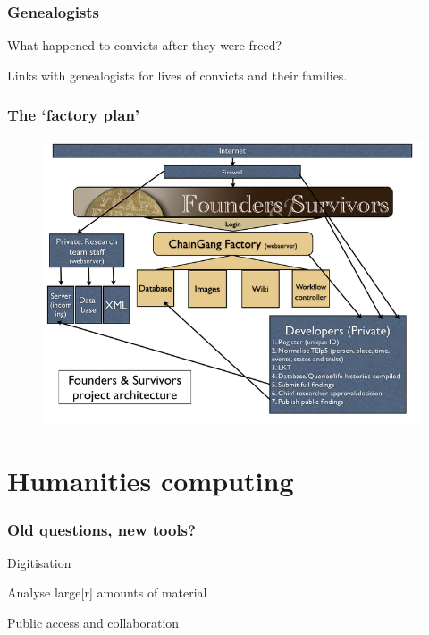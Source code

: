 \documentclass[ignorenonframetext,11pt]{beamer}
\begin{document}
\begin{frame}
\frametitle{Genealogists}
\label{genealogists}

What happened to convicts after they were freed?


Links with genealogists for lives of convicts and their families.



\end{frame}
		

\begin{frame}
\frametitle{The `factory plan'}
\label{thefactoryplan}

\begin{figure}
	\label{factory}
	\begin{center}
	\includegraphics[keepaspectratio,width=\textwidth, height=.75\textheight]{images/factory33.png}
	\end{center}
	\end{figure}
	



\end{frame}
		

\section{Humanities computing}
\label{humanitiescomputing}

\begin{frame}
\frametitle{Old questions, new tools?}
\label{oldquestionsnewtools}

Digitisation


Analyse large[r] amounts of material


Public access and collaboration



\end{frame}
		
\end{document}
